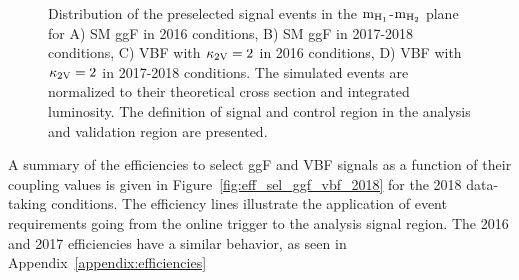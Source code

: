 \begin{figure}[htbp!]
\caption[Distribution of the preselected signal events in the $\hfstm$-$\hsndm$ plane]{\label{event_selection:fig:vsrcrsignal}Distribution of the preselected signal events in the $\hfstm$-$\hsndm$ plane for A) SM ggF in 2016 conditions,  B) SM ggF in 2017-2018 conditions,  C) VBF with $\mathrm{\kappa_{2V} }=2$ in 2016 conditions, D) VBF with $\mathrm{\kappa_{2V} }=2$ in 2017-2018 conditions. The simulated events are normalized to their theoretical cross section and integrated luminosity. The definition of signal and control region in the analysis and validation region are presented.}
\end{figure}

A summary of the efficiencies to select ggF and VBF signals as a function of their coupling values is given in Figure~\ref{fig:eff_sel_ggf_vbf_2018} for the 2018 data-taking conditions. The efficiency lines illustrate the application of event requirements going from the online trigger to the analysis signal region. The 2016 and 2017 efficiencies have a similar behavior, as seen in Appendix~\ref{appendix:efficiencies}


